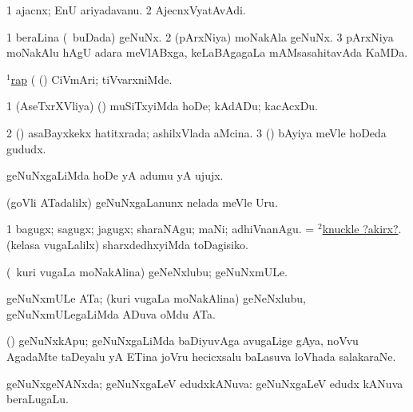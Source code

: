 \bentry
{}
\gl{\nA}
\bmng
\bnum
\num{1} ajacnx; EnU ariyadavanu. 
\num{2} AjecnxVyatAvAdi. 
\enum
\emng
\eentry

\bentry
{}
\gl{\saMkiSx}
\bmng
{} 
\emng
\eentry

\bentry
{}
\gl{\nA}
\bmng
\bnum
\num{1} beraLina (\kanmu\ buDada) geNuNx. 
\num{2} (pArxNiya) moNakAla geNuNx. 
\num{3} pArxNiya moNakAlu hAgU adara meVlABxga, keLaBAgagaLa mAMsasahitavAda KaMDa. 
\enum
\emng

\noindent
\gl{\pagu}
\bmng
\hyperref{kandict_r.pdf}{R}{rap(1)}{$^1$rap}  (  (\rUpa) CiVmAri; tiVvarxniMde. 
\emng

\noindent\gl{\nuga}
\bmng
\bnum
\num{1}  (AseTxrXVliya) (\ashi) muSiTxyiMda hoDe; kAdADu; kacAcxDu. 
\num{2}  (\AmA) asaBayxkekx hatitxrada; ashilxVlada aMcina. 
\num{3}  (\ashi) bAyiya meVle hoDeda gududx. 
\enum
\emng
\eentry

\bentry
{}
\gl{\sakirx}
\bmng
geNuNxgaLiMda hoDe yA adumu yA ujujx. 
\emng

\noindent
\gl{\akirx}
\bmng
(goVli ATadalilx) geNuNxgaLanunx nelada meVle Uru. 
\emng

\noindent\gl{\pagu}
\bmng
{} 
\bnum
\num{1}   bagugx; sagugx; jagugx; sharaNAgu; maNi; adhiVnanAgu. 
  
\banum
{} = \hyperlink{knuckle(2)}{$^2$knuckle ?akirx?}. 
 (kelasa \mo vugaLalilx) sharxdedhxyiMda toDagisiko. 
\eanum
\numie
\enum
\emng
\eentry

\bentry
{}
\gl{\nA}
\bmng
(\kanmu\ kuri \mo vugaLa moNakAlina) geNeNxlubu; geNuNxmULe. 
\emng
\eentry

\bentry
{}
\gl{\nA}
\bmng
geNuNxmULe ATa; (kuri \mo vugaLa moNakAlina) geNeNxlubu, geNuNxmULegaLiMda ADuva oMdu ATa. 
\emng
\eentry

\bentry
{}
\gl{\nA}
\bmng
(\birx) geNuNxkApu; geNuNxgaLiMda baDiyuvAga avugaLige gAya, noVvu AgadaMte taDeyalu yA ETina joVru hecicxsalu baLasuva loVhada salakaraNe. 
\emng
\eentry

\bentry
{}
\gl{\gu}
\bmng
geNuNxgeNANxda; geNuNxgaLeV edudxkANuva:  geNuNxgaLeV edudx kANuva beraLugaLu. 
\emng
\eentry

